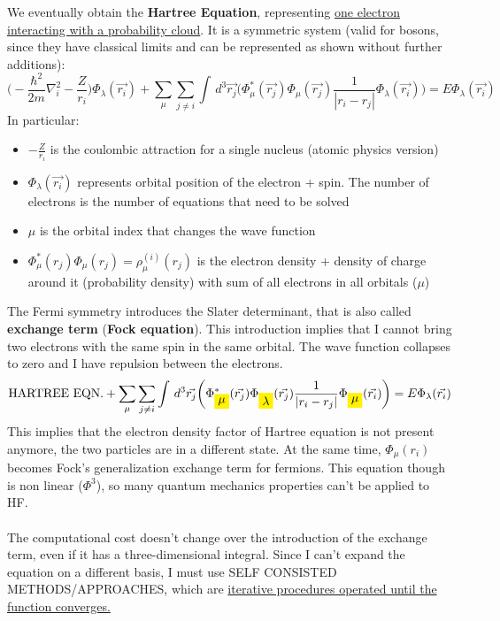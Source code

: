 We eventually obtain the \textbf{Hartree Equation}, representing \ul{one electron interacting with a probability cloud}. 
It is a symmetric system (valid for bosons, since they have classical limits and can be represented as shown without further additions):
\[
\bigg(-\frac{\hbar^2}{2m}\nabla^2_i-\frac{Z}{r_i}\bigg)\Phi_\lambda(\vec{r_i})+\sum_\mu \sum_{j \neq i} \int\,d^3\vec{r_j}\bigg(\Phi^*_\mu(\vec{r_j})\Phi_\mu(\vec{r_j})\frac{1}{|r_i-r_j|}\Phi_\lambda(\vec{r_i})\bigg)=E\Phi_\lambda(\vec{r_i})
\]
In particular:
\begin{itemize}
	\item $-\frac{Z}{r_i}$ is the coulombic attraction for a single nucleus (atomic physics version)
	\item $\Phi_\lambda(\vec{r_i})$ represents orbital position of the electron + spin. The number of electrons is the number of equations that need to be solved
	\item $\mu$ is the orbital index that changes the wave function
	\item $\Phi^*_\mu(r_j)\Phi_\mu(r_j) = \rho_\mu^{(i)}(r_j)$ is the electron density + density of charge around it (probability density) with sum of all electrons in all orbitals ($\mu$)
\end{itemize}
The Fermi symmetry introduces the Slater determinant, that is also called \textbf{exchange term} (\textbf{Fock equation}). 
This introduction implies that I cannot bring two electrons with the same spin in the same orbital. 
The wave function collapses to zero and I have repulsion between the electrons.\\
\[
\text{HARTREE EQN.}+
\sum_\mu \sum_{j \neq i} \int\,d^3\vec{r_j}\bigg(\Phi^*_{\mathcolorbox{yellow}{\mu}}(\vec{r_j})\Phi_{\mathcolorbox{yellow}{\lambda}}(\vec{r_j})\frac{1}{|r_i-r_j|}\Phi_{\mathcolorbox{yellow}{\mu}}(\vec{r_i})\bigg)=E\Phi_\lambda(\vec{r_i})
\]
This implies that the electron density factor of Hartree equation is not present anymore, the two particles are in a different state. 
At the same time, $\Phi_\mu(r_i)$ becomes Fock's generalization exchange term for fermions.
This equation though is non linear ($\Phi^3$), so many quantum mechanics properties can't be applied to HF.\\
\\
The computational cost doesn't change over the introduction of the exchange term, even if it has a three-dimensional integral.
Since I can't expand the equation on a different basis, I must use SELF CONSISTED METHODS/APPROACHES, which are \ul{iterative procedures operated until the function converges.}
